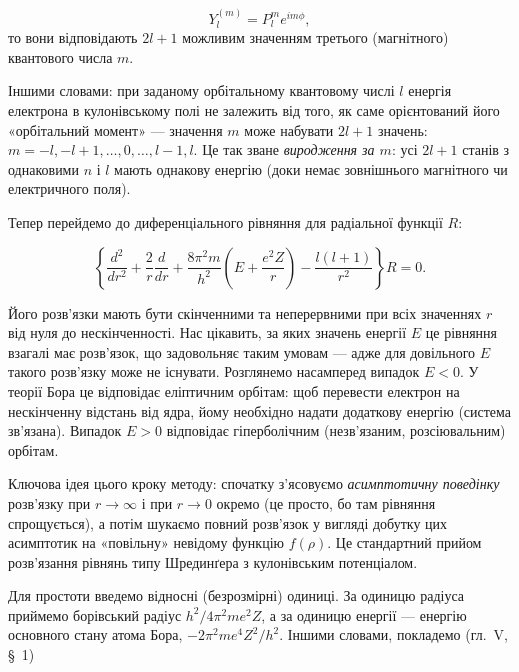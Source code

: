 \documentclass{article}
\begin{document}
\begin{equation}
Y_l^{(m)} = P_l^m e^{im\phi},
\end{equation}
%
то вони відповідають $2l+1$ можливим значенням третього (магнітного) квантового числа $m$.

\begin{note}
Іншими словами: при заданому орбітальному квантовому числі $l$ енергія електрона в кулонівському полі не залежить від того, як саме орієнтований його «орбітальний момент» --- значення $m$ може набувати $2l+1$ значень: $m = -l, -l+1, \dots, 0, \dots, l-1, l$. Це так зване \emph{виродження за $m$}: усі $2l+1$ станів з однаковими $n$ і $l$ мають однакову енергію (доки немає зовнішнього магнітного чи електричного поля).
\end{note}

Тепер перейдемо до диференціального рівняння для радіальної функції $R$:

\begin{equation}
\left\{ \frac{d^2}{dr^2} + \frac{2}{r} \frac{d}{dr} + \frac{8\pi^2 m}{h^2} \left( E + \frac{e^2 Z}{r} \right) - \frac{l(l+1)}{r^2} \right\} R = 0.
\end{equation}

Його розв'язки мають бути скінченними та неперервними при всіх значеннях $r$ від нуля до нескінченності. Нас цікавить, за яких значень енергії $E$ це рівняння взагалі має розв'язок, що задовольняє таким умовам --- адже для довільного $E$ такого розв'язку може не існувати. Розглянемо насамперед випадок $E<0$. У теорії Бора це відповідає еліптичним орбітам: щоб перевести електрон на нескінченну відстань від ядра, йому необхідно надати додаткову енергію (система зв'язана). Випадок $E>0$ відповідає гіперболічним (незв'язаним, розсіювальним) орбітам.

\begin{note}
Ключова ідея цього кроку методу: спочатку з'ясовуємо \emph{асимптотичну поведінку} розв'язку при $r\to\infty$ і при $r\to0$ окремо (це просто, бо там рівняння спрощується), а потім шукаємо повний розв'язок у вигляді добутку цих асимптотик на «повільну» невідому функцію $f(\rho)$. Це стандартний прийом розв'язання рівнянь типу Шрединґера з кулонівським потенціалом.
\end{note}

Для простоти введемо відносні (безрозмірні) одиниці. За одиницю радіуса приймемо борівський радіус $h^2/4\pi^2 me^2 Z$, а за одиницю енергії --- енергію основного стану атома Бора, $-2\pi^2 me^4 Z^2/h^2$. Іншими словами, покладемо (гл.~V, §~1)
\end{document}
